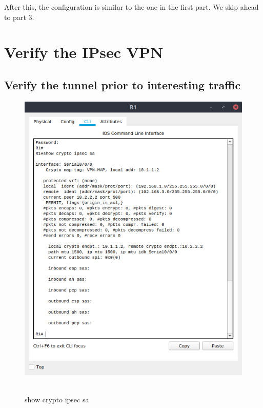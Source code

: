 \documentclass[12pt]{extarticle}
\begin{document}
After this, the configuration is similar to the one in the first part. We skip ahead to part 3.

\section{Verify the IPsec VPN}
\subsection{Verify the tunnel prior to interesting traffic}
\begin{center}
\begin{figure}[H]
\includegraphics[scale=0.7]{resources/q31.png}\
\caption{show crypto ipsec sa}
\end{figure}
\end{center}
\end{document}

